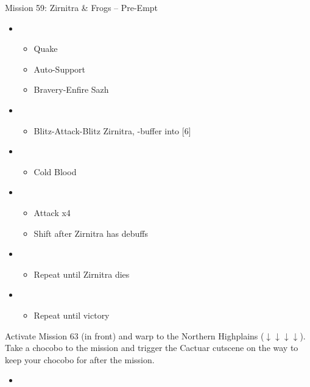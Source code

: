 \begin{battle}{Mission 59: Zirnitra \& Frogs -- Pre-Empt}
	\begin{itemize}
		\item \fifth
			\begin{itemize}
				\item Quake
				\item Auto-Support
				\item Bravery-Enfire Sazh
			\end{itemize}
		\item \third
			\begin{itemize}
				\item Blitz-Attack-Blitz Zirnitra, \rav-buffer into [6]
			\end{itemize}
		\item \sixth
			\begin{itemize}
				\item Cold Blood
			\end{itemize}
		\item \second
			\begin{itemize}
				\item Attack x4
				\item Shift after Zirnitra has debuffs
			\end{itemize}
		\item \third
			\begin{itemize}
				\item Repeat until Zirnitra dies
			\end{itemize}
		\item \first
			\begin{itemize}
				\item Repeat until victory
			\end{itemize}
	\end{itemize}
\end{battle}

Activate Mission 63 (in front) and warp to the Northern Highplains ($\downarrow\downarrow\downarrow\downarrow$).
Take a chocobo to the mission and trigger the Cactuar cutscene on the way to keep your chocobo for after the mission.

\begin{menu}
	\begin{itemize}
	\paradigm
		\begin{itemize}
			\item {}%
				{\paradigmline{\com}{\com}{\com}}%
				{\paradigmline{\com}{\com}{\sab}}%
				{\paradigmline{\com}{(\rav)}{(\sab)}}%
				{\paradigmline[4]{\syn}{\rav}{\sab}}%
				{\paradigmline{(\com)}{(\rav)}{(\rav)}}%
				{\paradigmline{\rav}{\rav}{\sab}}%
		\end{itemize}
	\end{itemize}
\end{menu}

